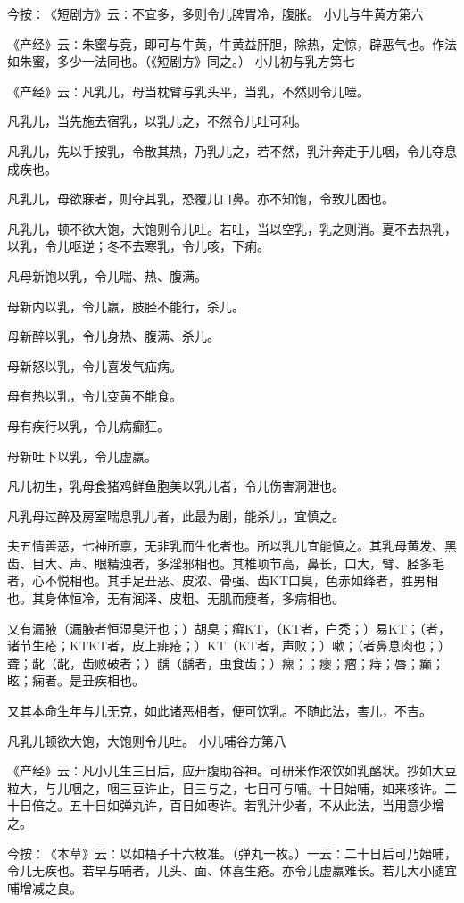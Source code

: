 \documentclass[a4paper,12pt,UTF8,twoside]{ctexbook}
\begin{document}
今按∶《短剧方》云∶不宜多，多则令儿脾胃冷，腹胀。
小儿与牛黄方第六

《产经》云∶朱蜜与竟，即可与牛黄，牛黄益肝胆，除热，定惊，辟恶气也。作法如朱蜜，多少一法同也。（《短剧方》同之。）
小儿初与乳方第七

《产经》云∶凡乳儿，母当枕臂与乳头平，当乳，不然则令儿噎。

凡乳儿，当先施去宿乳，以乳儿之，不然令儿吐可利。

凡乳儿，先以手按乳，令散其热，乃乳儿之，若不然，乳汁奔走于儿咽，令儿夺息成疾也。

凡乳儿，母欲寐者，则夺其乳，恐覆儿口鼻。亦不知饱，令致儿困也。

凡乳儿，顿不欲大饱，大饱则令儿吐。若吐，当以空乳，乳之则消。夏不去热乳，以乳，令儿呕逆；冬不去寒乳，令儿咳，下痢。

凡母新饱以乳，令儿喘、热、腹满。

母新内以乳，令儿羸，肢胫不能行，杀儿。

母新醉以乳，令儿身热、腹满、杀儿。

母新怒以乳，令儿喜发气疝病。

母有热以乳，令儿变黄不能食。

母有疾行以乳，令儿病癫狂。

母新吐下以乳，令儿虚羸。

凡儿初生，乳母食猪鸡鲜鱼胞美以乳儿者，令儿伤害洞泄也。

凡乳母过醉及房室喘息乳儿者，此最为剧，能杀儿，宜慎之。

夫五情善恶，七神所禀，无非乳而生化者也。所以乳儿宜能慎之。其乳母黄发、黑齿、目大、声、眼精浊者，多淫邪相也。其椎项节高，鼻长，口大，臂、胫多毛者，心不悦相也。其手足丑恶、皮浓、骨强、齿KT口臭，色赤如绛者，胜男相也。其身体恒冷，无有润泽、皮粗、无肌而瘦者，多病相也。

又有漏腋（漏腋者恒湿臭汗也；）胡臭；癣KT，（KT者，白秃；）易KT；（者，诸节生疮；KTKT者，皮上痱疮；）KT（KT者，声败；）嗽；（者鼻息肉也；）聋；龀（龀，齿败破者；）龋（龋者，虫食齿；）瘰；；瘿；瘤；痔；唇；癫；眩；痫者。是丑疾相也。

又其本命生年与儿无克，如此诸恶相者，便可饮乳。不随此法，害儿，不吉。

凡乳儿顿欲大饱，大饱则令儿吐。
小儿哺谷方第八

《产经》云∶凡小儿生三日后，应开腹助谷神。可研米作浓饮如乳酪状。抄如大豆粒大，与儿咽之，咽三豆许止，日三与之，七日可与哺。十日始哺，如来核许。二十日倍之。五十日如弹丸许，百日如枣许。若乳汁少者，不从此法，当用意少增之。

今按∶《本草》云∶以如梧子十六枚准。（弹丸一枚。）一云∶二十日后可乃始哺，令儿无疾也。若早与哺者，儿头、面、体喜生疮。亦令儿虚羸难长。若儿大小随宜哺增减之良。
\end{document}
